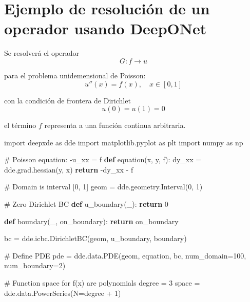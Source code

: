 \documentclass[
  spanish,
  us-letterpaper,
  DIV=11,
  numbers=noendperiod]{scrreprt}
\newenvironment{Shaded}{\begin{snugshade}}{\end{snugshade}}
\newcommand{\CommentTok}[1]{\textcolor[rgb]{0.37,0.37,0.37}{#1}}
\newcommand{\ControlFlowTok}[1]{\textcolor[rgb]{0.00,0.23,0.31}{\textbf{#1}}}
\newcommand{\DecValTok}[1]{\textcolor[rgb]{0.68,0.00,0.00}{#1}}
\newcommand{\ImportTok}[1]{\textcolor[rgb]{0.00,0.46,0.62}{#1}}
\newcommand{\KeywordTok}[1]{\textcolor[rgb]{0.00,0.23,0.31}{\textbf{#1}}}
\newcommand{\NormalTok}[1]{\textcolor[rgb]{0.00,0.23,0.31}{#1}}
\newcommand{\OperatorTok}[1]{\textcolor[rgb]{0.37,0.37,0.37}{#1}}
\theoremstyle{definition}
\theoremstyle{plain}
\theoremstyle{remark}
\begin{document}
\section{Ejemplo de resolución de un operador usando
DeepONet}\label{ejemplo-de-resoluciuxf3n-de-un-operador-usando-deeponet}

Se resolverá el operador \[
G: f\rightarrow u
\]

para el problema unidemensional de Poisson: \[
u''(x) = f(x), \quad x\in[0,1]
\]

con la condición de frontera de Dirichlet \[
u(0)=u(1)=0
\]

el término \(f\) representa a una función continua arbitraria.

\begin{Shaded}
\begin{Highlighting}[]
\ImportTok{import}\NormalTok{ deepxde }\ImportTok{as}\NormalTok{ dde}
\ImportTok{import}\NormalTok{ matplotlib.pyplot }\ImportTok{as}\NormalTok{ plt}
\ImportTok{import}\NormalTok{ numpy }\ImportTok{as}\NormalTok{ np}


\CommentTok{\# Poisson equation: {-}u\_xx = f}
\KeywordTok{def}\NormalTok{ equation(x, y, f):}
\NormalTok{    dy\_xx }\OperatorTok{=}\NormalTok{ dde.grad.hessian(y, x)}
    \ControlFlowTok{return} \OperatorTok{{-}}\NormalTok{dy\_xx }\OperatorTok{{-}}\NormalTok{ f}

\CommentTok{\# Domain is interval [0, 1]}
\NormalTok{geom }\OperatorTok{=}\NormalTok{ dde.geometry.Interval(}\DecValTok{0}\NormalTok{, }\DecValTok{1}\NormalTok{)}

\CommentTok{\# Zero Dirichlet BC}
\KeywordTok{def}\NormalTok{ u\_boundary(\_):}
    \ControlFlowTok{return} \DecValTok{0}

\KeywordTok{def}\NormalTok{ boundary(\_, on\_boundary):}
    \ControlFlowTok{return}\NormalTok{ on\_boundary}

\NormalTok{bc }\OperatorTok{=}\NormalTok{ dde.icbc.DirichletBC(geom, u\_boundary, boundary)}

\CommentTok{\# Define PDE}
\NormalTok{pde }\OperatorTok{=}\NormalTok{ dde.data.PDE(geom, equation, bc, num\_domain}\OperatorTok{=}\DecValTok{100}\NormalTok{, num\_boundary}\OperatorTok{=}\DecValTok{2}\NormalTok{)}

\CommentTok{\# Function space for f(x) are polynomials}
\NormalTok{degree }\OperatorTok{=} \DecValTok{3}
\NormalTok{space }\OperatorTok{=}\NormalTok{ dde.data.PowerSeries(N}\OperatorTok{=}\NormalTok{degree }\OperatorTok{+} \DecValTok{1}\NormalTok{)}


\end{Highlighting}
\end{Shaded}
\end{document}

